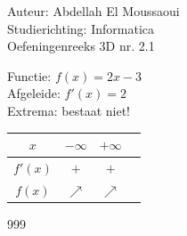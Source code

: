 \documentclass[a4paper]{article}
\begin{document}
  
\noindent \large Auteur: Abdellah El Moussaoui \\
\noindent \large Studierichting: Informatica\\
\noindent \large Oefeningenreeks 3D nr. 2.1\\

\medskip

\normalsize


Functie: $f(x) = 2x - 3$ \\

Afgeleide: $f'(x) = 2$ \\

Extrema: bestaat niet! \\



\begin{tabular}{c|ccc}
        $x$     & $-\infty$ & $+\infty$\\ 
        \hline
        $f'(x)$ &  $+$     &  $+$  \\ 
        \hline
        $f(x)$  & $\nearrow$  & $\nearrow$\\
\end{tabular}
  
    

\begin{thebibliography}{999}
\end{thebibliography}
\end{document}
